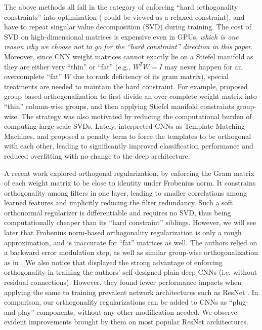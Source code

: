 \documentclass{article}
\newcounter{ass_counter}
\begin{document}
The above methods
\cite{jia2016improving,harandi2016generalized,ozay2016optimization,huang2017orthogonal} all fall in the category of enforcing ``hard orthogonality constraints'' into optimization (\cite{jia2016improving} could be viewed as a relaxed constraint), and have to repeat singular value decomposition (SVD) during training. The cost of SVD on high-dimensional matrices is expensive even in GPUs, \textit{which is one reason why we choose not to go for the ``hard constraint'' direction in this paper}. Moreover, since CNN weight matrices cannot exactly lie on a Stiefel manifold as they are either very ``thin'' or ``fat'' (e.g., $W^T W = I$ may never happen for an overcomplete ``fat'' $W$ due to rank deficiency of its gram matrix), special treatments are needed to maintain the hard constraint. For example, \cite{huang2017orthogonal} proposed group based orthogonalization to first divide an over-complete weight matrix into ``thin'' column-wise groups, and then applying Stiefel manifold constraints group-wise. The strategy was also motivated by reducing the computational burden of computing large-scale SVDs. Lately, \cite{balestriero2018spline,balestriero2018mad} interpreted CNNs as Template Matching Machines, and proposed a penalty term to force the templates to be orthogonal with each other, leading to significantly improved classification performance and reduced overfitting with no change to the deep architecture.

A recent work \cite{xie2017all} explored orthogonal regularization, by enforcing the Gram matrix of each weight matrix to be close to identity under Frobenius norm. It constrains orthogonality among filters in one layer, leading to smaller correlations among learned features and implicitly reducing the filter redundancy. Such a soft orthonormal regularizer is differentiable and requires no SVD, thus being computationally cheaper than its ``hard constraint'' siblings. However, we will see later that Frobenius norm-based orthogonality regularization is only a rough approximation, and is inaccurate for ``fat'' matrices as well. The authors relied on a backward error modulation step, as well as similar group-wise orthogonalization as in \cite{huang2017orthogonal}. We also notice that \cite{xie2017all} displayed the strong advantage of enforcing orthogonality in training the authors' self-designed plain deep CNNs (i.e. without residual connections). However, they found fewer performance impacts when applying the same to training prevalent network architectures such as ResNet \cite{he2016deep}.
In comparison, our orthogonality regularizations can be added to CNNs as ``plug-and-play'' components, without any other modification needed. We observe evident improvements brought by them on most popular ResNet architectures.
\end{document}
